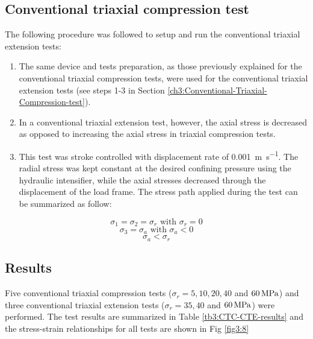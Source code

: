 \subsection{Conventional triaxial compression test}

The following procedure was followed to setup and run the conventional triaxial extension tests:

\begin{enumerate}
    \item The same device and tests preparation, as those previously explained for the conventional triaxial compression tests, were used for the conventional triaxial extension tests (see steps 1-3 in Section \ref{ch3:Conventional-Triaxial-Compression-test}).
    \item In a conventional triaxial extension test, however, the axial stress is decreased as opposed to increasing the axial stress in triaxial compression tests. 
    \item This test was stroke controlled with displacement rate of \SI{0.001}{\meter\per\second}. The radial stress was kept constant at the desired confining pressure using the hydraulic intensifier, while the axial stresses decreased through the displacement of the load frame. The stress path applied during the test can be summarized as follow:
\end{enumerate}
\begin{equation}
    \sigma_1 = \sigma_2 = \sigma_r  \text{ with } \sigma_r = 0 
\end{equation}
\begin{equation}
    \sigma_3 = \sigma_a \text{ with } \sigma_a < 0  
\end{equation}
\begin{equation}
    \sigma_a < \sigma_r
\end{equation}

\subsection{Results}

Five conventional triaxial compression tests ($\sigma_r =  5,10,20,40$ and $\SIlist{60}{MPa}$) and three conventional triaxial extension tests ($\sigma_r = 35,40$ and $\SIlist{60}{MPa}$) were performed. The test results are summarized in Table \ref{tb3:CTC-CTE-results} and the stress-strain relationships for all tests are shown in Fig \ref{fig3:8}

